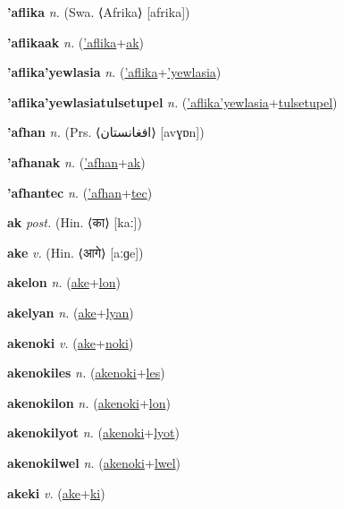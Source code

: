 \textbf{\hypertarget{'aflika}{'aflika}} \textit{n.} (Swa. ⟨Afrika⟩ [afrika])


\textbf{\hypertarget{'aflikaak}{'aflikaak}} \textit{n.} (\hyperlink{'aflika}{'aflika}+\allowbreak \hyperlink{ak}{ak})


\textbf{\hypertarget{'aflika'yewlasia}{'aflika'yewlasia}} \textit{n.} (\hyperlink{'aflika}{'aflika}+\allowbreak \hyperlink{'yewlasia}{'yewlasia})


\textbf{\hypertarget{'aflika'yewlasiatulsetupel}{'aflika'yewlasiatulsetupel}} \textit{n.} (\hyperlink{'aflika'yewlasia}{'aflika'yewlasia}+\allowbreak \hyperlink{tulsetupel}{tulsetupel})


\textbf{\hypertarget{'afhan}{'afhan}} \textit{n.} (Prs. ⟨{\arabics{}افغانستان‬}⟩ [avɣɒn])


\textbf{\hypertarget{'afhanak}{'afhanak}} \textit{n.} (\hyperlink{'afhan}{'afhan}+\allowbreak \hyperlink{ak}{ak})


\textbf{\hypertarget{'afhantec}{'afhantec}} \textit{n.} (\hyperlink{'afhan}{'afhan}+\allowbreak \hyperlink{tec}{tec})


\textbf{\hypertarget{ak}{ak}} \textit{post.} (Hin. ⟨{\devanagari{}का}⟩ [kaː])


\textbf{\hypertarget{ake}{ake}} \textit{v.} (Hin. ⟨{\devanagari{}आगे}⟩ [aːɡe])


\textbf{\hypertarget{akelon}{akelon}} \textit{n.} (\hyperlink{ake}{ake}+\allowbreak \hyperlink{lon}{lon})


\textbf{\hypertarget{akelyan}{akelyan}} \textit{n.} (\hyperlink{ake}{ake}+\allowbreak \hyperlink{lyan}{lyan})


\textbf{\hypertarget{akenoki}{akenoki}} \textit{v.} (\hyperlink{ake}{ake}+\allowbreak \hyperlink{noki}{noki})


\textbf{\hypertarget{akenokiles}{akenokiles}} \textit{n.} (\hyperlink{akenoki}{akenoki}+\allowbreak \hyperlink{les}{les})


\textbf{\hypertarget{akenokilon}{akenokilon}} \textit{n.} (\hyperlink{akenoki}{akenoki}+\allowbreak \hyperlink{lon}{lon})


\textbf{\hypertarget{akenokilyot}{akenokilyot}} \textit{n.} (\hyperlink{akenoki}{akenoki}+\allowbreak \hyperlink{lyot}{lyot})


\textbf{\hypertarget{akenokilwel}{akenokilwel}} \textit{n.} (\hyperlink{akenoki}{akenoki}+\allowbreak \hyperlink{lwel}{lwel})


\textbf{\hypertarget{akeki}{akeki}} \textit{v.} (\hyperlink{ake}{ake}+\allowbreak \hyperlink{ki}{ki})


